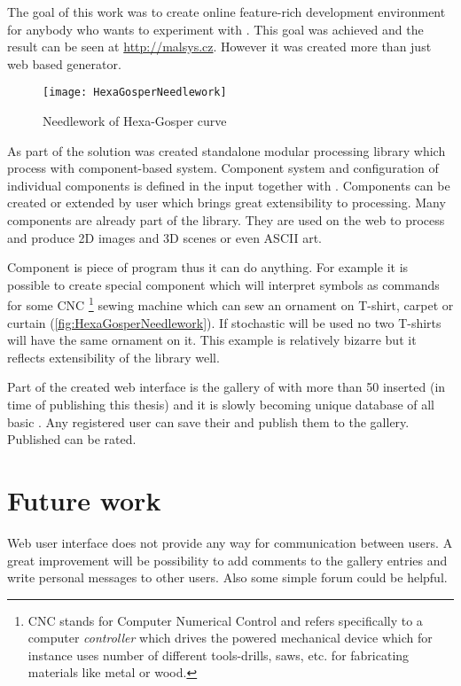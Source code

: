 

The goal of this work was to create online feature-rich development environment for anybody who wants to experiment with \lsystems.
This goal was achieved and the result can be seen at \url{http://malsys.cz}.
However it was created more than just web based \lsystem generator.

\begin{wrapfigure}{r}{0.5\textwidth}
	\texttt{[image: HexaGosperNeedlework]}
	\caption{Needlework of Hexa-Gosper curve}
	\label{fig:HexaGosperNeedlework}
\end{wrapfigure}

As part of the solution was created standalone modular \lsystem processing library which process \lsystems with component-based system.
Component system and configuration of individual components is defined in the input together with \lsystems.
Components can be created or extended by user which brings great extensibility to \lsystem processing.
Many components are already part of the library.
They are used on the web to process \lsystems and produce 2D images and 3D scenes or even ASCII art.

Component is piece of program thus it can do anything.
For example it is possible to create special component which will interpret \lsystem symbols as commands for some CNC%
	\footnote{CNC stands for Computer Numerical Control and refers specifically to a computer \emph{controller} which drives the powered mechanical device
		which for instance uses number of different tools-drills, saws, etc. for fabricating materials like metal or wood.} 
	sewing machine which can sew an ornament on T-shirt, carpet or curtain (\autoref{fig:HexaGosperNeedlework}).
If stochastic \lsystem will be used no two T-shirts will have the same ornament on it.
This example is relatively bizarre but it reflects extensibility of the library well.

Part of the created web interface is the gallery of \lsystems with more than 50 inserted \lsystems (in time of publishing this thesis) and it is slowly becoming unique database of all basic \lsystems.
Any registered user can save their \lsystems and publish them to the gallery.
Published \lsystems can be rated.


\section*{Future work}

Web user interface does not provide any way for communication between users.
A great improvement will be possibility to add comments to the gallery entries and write personal messages to other users.
Also some simple forum could be helpful.

